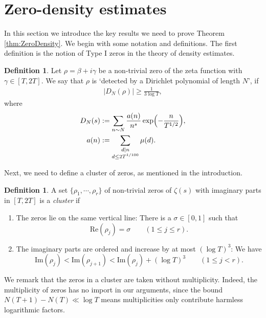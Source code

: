 \documentclass[12pt]{amsart}
\theoremstyle{plain}
\theoremstyle{definition}
\newtheorem{definition}[theorem]{Definition}
\theoremstyle{remark}
\begin{document}
\section{Zero-density estimates}\label{sec:ZeroDensity}
%
%
%
%
In this section we introduce the key results we need to prove Theorem \ref{thm:ZeroDensity}. We begin with some notation and definitions. The first definition is the notion of Type I zeros in the theory of density estimates.
%
%
%
%
\begin{definition}
Let $\rho = \beta+i\gamma$ be a non-trivial zero of the zeta function with $\gamma \in [T,2T]$. We say that $\rho$ is `detected by a Dirichlet polynomial of length $N$', if
\begin{align}\label{eq:NDetector}
|D_N(\rho)| \ge \frac{1}{3\log T},
\end{align}
where
\begin{align}
D_N(s)&:=\sum_{n\sim N}\frac{a(n)}{n^s}\exp \Bigl( -\frac{n}{T^{1/2}}\Bigr),\label{eq:DNDef}\\
a(n)& := \sum_{\substack{d \mid n \\ d\leq 2T^{1/100} }} \mu(d).
\label{eq:anDef}
\end{align}
\end{definition}
%
%
%
%
Next, we need to define a cluster of zeros, as mentioned in the introduction.
%
%
%
%
\begin{definition}\label{dfntn:Cluster}
A set $ \{\rho_1 , \cdots , \rho_r\}$ of non-trivial zeros of $\zeta(s)$ with imaginary parts in $[T,2T]$ is a \emph{cluster} if
\begin{enumerate}
\item The zeros lie on the same vertical line: There is a $\sigma\in[0,1]$ such that
\[
\text{Re}(\rho_j)=\sigma\qquad (1\le j\le r).
\]
\item The imaginary parts are ordered and increase by at most $(\log{T})^3$: We have
\[
\text{Im}(\rho_j)<\text{Im}(\rho_{j+1})<\text{Im}(\rho_j)+(\log{T})^3\qquad (1\le j<r).
\]
\end{enumerate}
\end{definition}
%
%
%
%
We remark that the zeros in a cluster are taken without multiplicity. Indeed, the multiplicity of zeros has no import in our arguments, since the bound $N(T+1)-N(T)\ll \log T$ means multiplicities only contribute harmless logarithmic factors.
%
%
%
%
\end{document}
